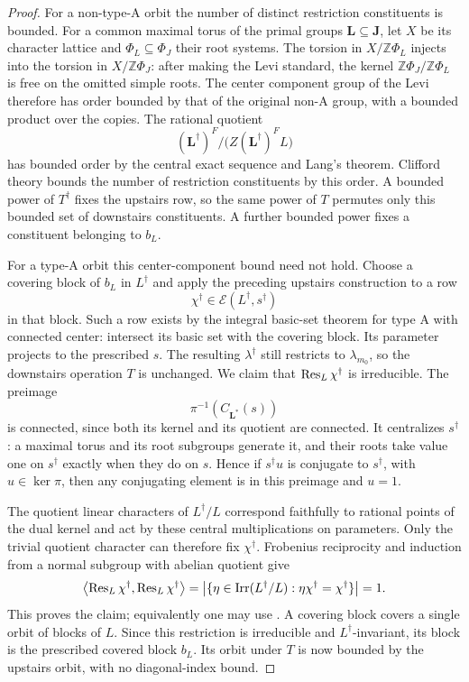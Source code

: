 \begin{proof}
For a non-type-A orbit the number of distinct restriction
constituents is bounded.  For a common maximal torus of the primal
groups $\mathbf L\subseteq\mathbf J$, let $X$ be its character
lattice and $\Phi_L\subseteq\Phi_J$ their root systems.  The torsion in
$X/\mathbb Z\Phi_L$ injects into the torsion in
$X/\mathbb Z\Phi_J$: after making the Levi standard, the kernel
$\mathbb Z\Phi_J/\mathbb Z\Phi_L$ is free on the omitted simple
roots.  The center component group of the Levi therefore has order
bounded by that of the original non-A group, with a bounded product
over the copies.  The rational quotient
\[
 (\mathbf L^\dagger)^F/
       \bigl(Z(\mathbf L^\dagger)^F L\bigr)
\]
has bounded order by the central exact sequence and Lang's theorem.
Clifford theory bounds the number of restriction constituents by
this order.  A bounded power of $T^\dagger$ fixes the upstairs row,
so the same power of $T$ permutes only this bounded set of
downstairs constituents.  A further bounded power fixes a
constituent belonging to $b_L$.

For a type-A orbit this center-component bound need not hold.
Choose a covering block of $b_L$ in $L^\dagger$ and apply the
preceding upstairs construction to a row
\[
 \chi^\dagger\in\mathcal E(L^\dagger,s^\dagger)
\]
in that block.  Such a row exists by the integral basic-set theorem
for type A with connected center: intersect its basic set with the
covering block.  Its parameter projects to the prescribed $s$.
The resulting $\lambda^\dagger$ still restricts to $\lambda_{m_0}$,
so the downstairs operation $T$ is unchanged.
We claim that $\operatorname{Res}_L\chi^\dagger$ is irreducible.  The preimage
\[
 \pi^{-1}(C_{\mathbf L^*}(s))
\]
is connected, since both its kernel and its quotient are connected.
It centralizes $s^\dagger$: a maximal torus and its root subgroups
generate it, and their roots take value one on $s^\dagger$ exactly
when they do on $s$.  Hence if $s^\dagger u$ is conjugate to
$s^\dagger$, with $u\in\ker\pi$, then any conjugating element is
in this preimage and $u=1$.

The quotient linear characters of $L^\dagger/L$ correspond
faithfully to rational points of the dual kernel and act by these
central multiplications on parameters.  Only the trivial quotient
character can therefore fix $\chi^\dagger$.  Frobenius reciprocity
and induction from a normal subgroup with abelian quotient give
\[
 \bigl\langle\operatorname{Res}_L\chi^\dagger,
                    \operatorname{Res}_L\chi^\dagger\bigr\rangle
 =\bigl|\{\eta\in\operatorname{Irr}(L^\dagger/L):
                         \eta\chi^\dagger=\chi^\dagger\}\bigr|=1.
\]
This proves the claim; equivalently one may use
\cite[Lemma~4.8]{SFTV}.  A covering block covers a single orbit of
blocks of $L$.  Since this restriction is irreducible and
$L^\dagger$-invariant, its block is the prescribed covered block
$b_L$.  Its orbit under $T$ is now
bounded by the upstairs orbit, with no diagonal-index bound.


\end{proof}
